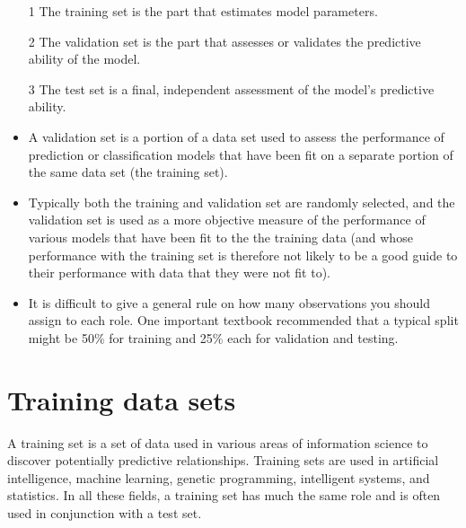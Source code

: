 \documentclass[a4paper,12pt]{article}
\begin{document}
\begin{framed}
	\begin{itemize}
		\item[1] The training set is the part that estimates model parameters.
		\item[2] The validation set is the part that assesses or validates the predictive ability of the model.
		\item[3] The test set is a final, independent assessment of the model's predictive ability.
	\end{itemize}
\end{framed}
\begin{itemize}
	\item A validation set is a portion of a data set used to assess the performance of prediction or classification models that have been fit on a separate portion of the same data set (the training set). 
	\item Typically both the training and validation set are randomly selected, and the validation set is used as a more objective measure of the performance of various models that have been fit to the the training data (and whose performance with the training set is therefore not
	likely to be a good guide to their performance with data that they were not fit to).
	
	\item It is difficult to give a general rule on how many observations you should assign to each role. One important textbook recommended that a typical split might be 50\% for training and 25\% each for validation and testing.
	
\end{itemize}



\section{Training data sets}

A training set is a set of data used in various areas of information science to discover potentially predictive relationships. Training sets are used in artificial intelligence, machine learning, genetic programming, intelligent systems, and statistics. In all these fields, a training set has much the same role and is often used in conjunction with a test set.

\end{document}

